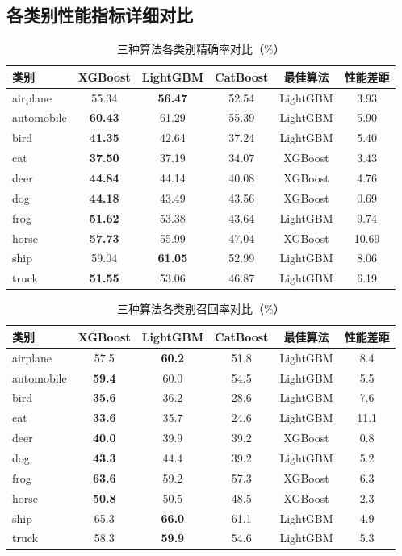 \documentclass[UTF8]{report}
\theoremstyle{MyLineTheoremStyle} %
\theoremstyle{MyBlockTheoremStyle} %
\theoremstyle{MySubsubsectionStyle} %
\begin{document}
\subsection{各类别性能指标详细对比}
\begin{table}[H]
    \centering
    \caption{三种算法各类别精确率对比（\%）}
    \begin{tabular}{lccccc}
        \toprule
        类别 & XGBoost & LightGBM & CatBoost & 最佳算法 & 性能差距 \\ \midrule
        airplane & 55.34 & \textbf{56.47} & 52.54 & LightGBM & 3.93 \\
        automobile & \textbf{60.43} & 61.29 & 55.39 & LightGBM & 5.90 \\
        bird & \textbf{41.35} & 42.64 & 37.24 & LightGBM & 5.40 \\
        cat & \textbf{37.50} & 37.19 & 34.07 & XGBoost & 3.43 \\
        deer & \textbf{44.84} & 44.14 & 40.08 & XGBoost & 4.76 \\
        dog & \textbf{44.18} & 43.49 & 43.56 & XGBoost & 0.69 \\
        frog & \textbf{51.62} & 53.38 & 43.64 & LightGBM & 9.74 \\
        horse & \textbf{57.73} & 55.99 & 47.04 & XGBoost & 10.69 \\
        ship & 59.04 & \textbf{61.05} & 52.99 & LightGBM & 8.06 \\
        truck & \textbf{51.55} & 53.06 & 46.87 & LightGBM & 6.19 \\ \bottomrule
    \end{tabular}
\end{table}

\begin{table}[H]
    \centering
    \caption{三种算法各类别召回率对比（\%）}
    \begin{tabular}{lccccc}
        \toprule
        类别 & XGBoost & LightGBM & CatBoost & 最佳算法 & 性能差距 \\ \midrule
        airplane & 57.5 & \textbf{60.2} & 51.8 & LightGBM & 8.4 \\
        automobile & \textbf{59.4} & 60.0 & 54.5 & LightGBM & 5.5 \\
        bird & \textbf{35.6} & 36.2 & 28.6 & LightGBM & 7.6 \\
        cat & \textbf{33.6} & 35.7 & 24.6 & LightGBM & 11.1 \\
        deer & \textbf{40.0} & 39.9 & 39.2 & XGBoost & 0.8 \\
        dog & \textbf{43.3} & 44.4 & 39.2 & LightGBM & 5.2 \\
        frog & \textbf{63.6} & 59.2 & 57.3 & XGBoost & 6.3 \\
        horse & \textbf{50.8} & 50.5 & 48.5 & XGBoost & 2.3 \\
        ship & 65.3 & \textbf{66.0} & 61.1 & LightGBM & 4.9 \\
        truck & 58.3 & \textbf{59.9} & 54.6 & LightGBM & 5.3 \\ \bottomrule
    \end{tabular}
\end{table}
\end{document}
